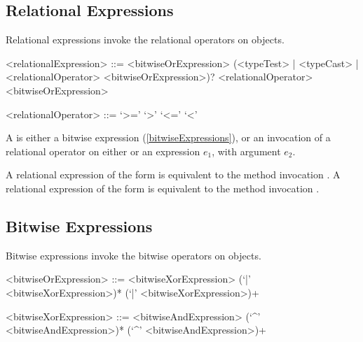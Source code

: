 \documentclass[makeidx]{article}
\begin{document}
{


\subsection{Relational Expressions}

\LMHash{}%
Relational expressions invoke the relational operators on objects.

\begin{grammar}
<relationalExpression> ::= <bitwiseOrExpression> \gnewline{}
  (<typeTest> | <typeCast> | <relationalOperator> <bitwiseOrExpression>)?
  \alt \SUPER{} <relationalOperator> <bitwiseOrExpression>

<relationalOperator> ::= `>='
  \alt `>'
  \alt `<='
  \alt `<'
\end{grammar}

\LMHash{}%
A  is either a bitwise expression
(\ref{bitwiseExpressions}),
or an invocation of a relational operator on either \SUPER{}
or an expression $e_1$, with argument $e_2$.

\LMHash{}%
A relational expression of the form 
is equivalent to the method invocation .
A relational expression of the form 
is equivalent to the method invocation .


\subsection{Bitwise Expressions}

\LMHash{}%
Bitwise expressions invoke the bitwise operators on objects.

\begin{grammar}
<bitwiseOrExpression> ::= \gnewline{}
  <bitwiseXorExpression> (`|' <bitwiseXorExpression>)*
  \alt \SUPER{} (`|' <bitwiseXorExpression>)+

<bitwiseXorExpression> ::= \gnewline{}
  <bitwiseAndExpression> (`^' <bitwiseAndExpression>)*
  \alt \SUPER{} (`^' <bitwiseAndExpression>)+


\end{grammar}}
\end{document}
